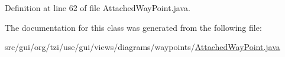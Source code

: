 Definition at line 62 of file Attached\-Way\-Point.\-java.



The documentation for this class was generated from the following file\-:\begin{DoxyCompactItemize}
\item 
src/gui/org/tzi/use/gui/views/diagrams/waypoints/\hyperlink{_attached_way_point_8java}{Attached\-Way\-Point.\-java}\end{DoxyCompactItemize}
